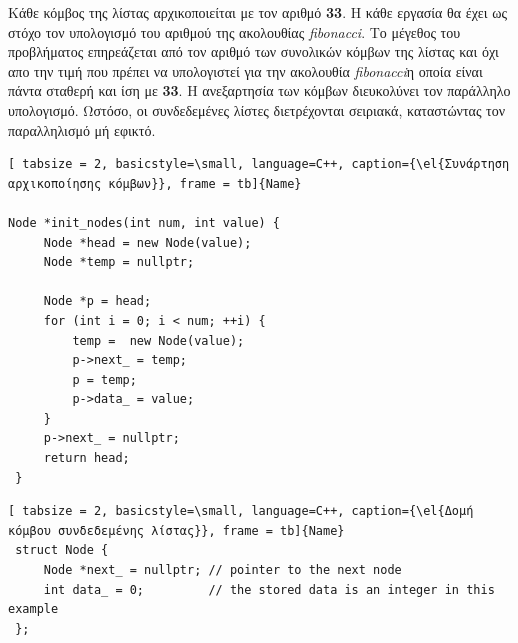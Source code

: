 \documentclass[12pt]{article}
\newcommand{\en}[1]{\foreignlanguage{english}{#1}}
\newcommand{\el}[1]{\selectlanguage{greek}{#1}\selectlanguage{english}}
\begin{document}
Κάθε κόμβος της λίστας αρχικοποιείται με τον αριθμό \textbf{33}. Η κάθε εργασία θα έχει ως στόχο τον υπολογισμό του αριθμού της ακολουθίας \emph{\en{fibonacci}}.
Το μέγεθος του προβλήματος επηρεάζεται από τον αριθμό των συνολικών κόμβων της λίστας και όχι απο την τιμή που πρέπει να υπολογιστεί για την ακολουθία \emph{fibonacci}η οποία είναι πάντα σταθερή και ίση με \textbf{33}.
Η ανεξαρτησία των κόμβων διευκολύνει τον παράλληλο υπολογισμό. Ωστόσο, οι συνδεδεμένες λίστες διετρέχονται σειριακά, καταστώντας τον παραλληλισμό μή εφικτό.
\ \\
\begin{center}

\begin{lstlisting}[ tabsize = 2, basicstyle=\small, language=C++, caption={\el{Συνάρτηση αρχικοποίησης κόμβων}}, frame = tb]{Name}
		
Node *init_nodes(int num, int value) {
     Node *head = new Node(value);
     Node *temp = nullptr;
 
     Node *p = head;
     for (int i = 0; i < num; ++i) {
         temp =  new Node(value);
         p->next_ = temp;
         p = temp;
         p->data_ = value;
     }
     p->next_ = nullptr;
     return head;
 }
\end{lstlisting}
\end{center}
\clearpage
{}
\begin{lstlisting}[ tabsize = 2, basicstyle=\small, language=C++, caption={\el{Δομή κόμβου συνδεδεμένης λίστας}}, frame = tb]{Name}
 struct Node {
     Node *next_ = nullptr; // pointer to the next node
     int data_ = 0;         // the stored data is an integer in this example
 };
\end{lstlisting}
\end{document}
